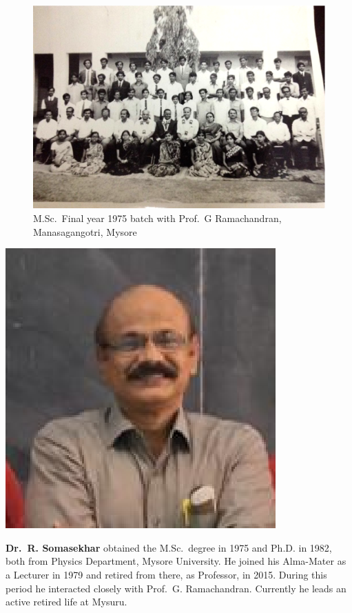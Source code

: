 \begin{figure}[H]
\centering
\includegraphics[scale=0.278]{src/images/chap8/8.eps}
\caption{M.Sc.\ Final year 1975 batch with Prof.\ G Ramachandran, Manasagangotri, Mysore}
\end{figure}
\vskip 1cm

\centerline{\includegraphics[scale=.8]{authorsphotos/Somasekhar.eps}}
\smallskip

\bigskip

\noindent
\textbf{Dr.\ R. Somasekhar} obtained the M.Sc.\ degree in 1975 and Ph.D. in 1982, both from Physics Department, Mysore University. 
He joined his Alma-Mater as a Lecturer in 1979 and retired from there, as Professor, in 2015. During this period he interacted closely with 
Prof.\ G. Ramachandran. Currently he leads an active retired life at Mysuru.
